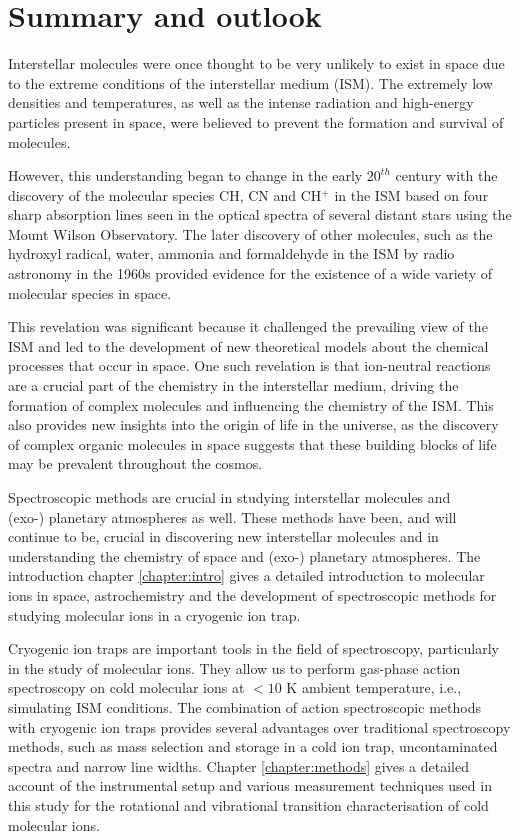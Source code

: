 \chapter{Summary and outlook}
Interstellar molecules were once thought to be very unlikely to exist in space due to the extreme conditions of the interstellar medium (ISM). The extremely low densities and temperatures, as well as the intense radiation and high-energy particles present in space, were believed to prevent the formation and survival of molecules.

However, this understanding began to change in the early $20^{th}$ century with the discovery of the molecular species CH, CN and CH$^+$ in the ISM based on four sharp absorption lines seen in the optical spectra of several distant stars using the Mount Wilson Observatory. The later discovery of other molecules, such as the hydroxyl radical, water, ammonia and formaldehyde in the ISM by radio astronomy in the 1960s provided evidence for the existence of a wide variety of molecular species in space.

This revelation was significant because it challenged the prevailing view of the ISM and led to the development of new theoretical models about the chemical processes that occur in space. One such revelation is that ion-neutral reactions are a crucial part of the chemistry in the interstellar medium, driving the formation of complex molecules and influencing the chemistry of the ISM. This also provides new insights into the origin of life in the universe, as the discovery of complex organic molecules in space suggests that these building blocks of life may be prevalent throughout the cosmos.

Spectroscopic methods are crucial in studying interstellar molecules and \\(exo-) planetary atmospheres as well. These methods have been, and will continue to be, crucial in discovering new interstellar molecules and in understanding the chemistry of space and (exo-) planetary atmospheres. The introduction chapter \ref{chapter:intro} gives a detailed introduction to molecular ions in space, astrochemistry and the development of spectroscopic methods for studying molecular ions in a cryogenic ion trap.

Cryogenic ion traps are important tools in the field of spectroscopy, particularly in the study of molecular ions. They allow us to perform gas-phase action spectroscopy on cold molecular ions at $< 10$ K ambient temperature, i.e., simulating ISM conditions. The combination of action spectroscopic methods with cryogenic ion traps provides several advantages over traditional spectroscopy methods, such as mass selection and storage in a cold ion trap, uncontaminated spectra and narrow line widths. Chapter \ref{chapter:methods} gives a detailed account of the instrumental setup and various measurement techniques used in this study for the rotational and vibrational transition characterisation of cold molecular ions.

